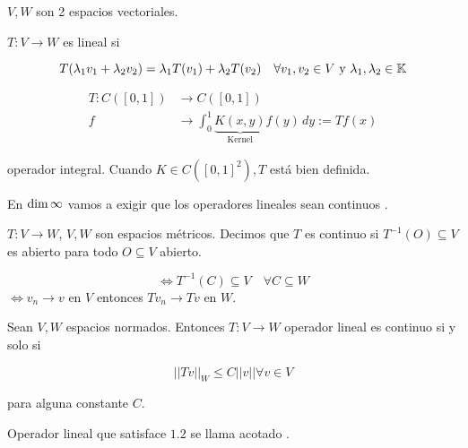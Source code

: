 \documentclass[../Apunte.tex]{subfiles}
\begin{document}
\begin{fdefinition}
    $V,W$ son 2 espacios vectoriales.

    $T:V\to W$ es lineal si 

    \[T(\lambda_1 v_1+\lambda_2 v_2)=\lambda_1 T(v_1)+\lambda_2 T(v_2)\quad \forall v_1,v_2\in V\text{ y } \lambda_1,\lambda_2\in \mathbb{K}\]

\end{fdefinition}

\begin{align*}T:C([0,1])&\to C([0,1])\\
f&\to \int_0^1 \underbrace{K(x,y)}_{\text{Kernel}} f(y)\,dy:=Tf(x)\end{align*}

operador integral. Cuando $K\in C([0,1]^2), T$ está bien definida.

En $\operatorname{dim} \infty$ vamos a exigir que los operadores lineales sean \color{red} continuos \color{black}.

\begin{fdefinition}
    $T:V\to W$, $V,W$ son espacios métricos. Decimos que $T$ es continuo si $T^{-1}(O)\subseteq V$ es abierto para todo $O\subseteq V$ abierto.

    \[\iff T^{-1}(C)\subseteq V\quad \forall C\subseteq W\]
    $\iff v_n\to v$ en $V$ entonces $Tv_n\to Tv$ en $W$.
\end{fdefinition}

\begin{ftheorem}
    Sean $V,W$ espacios normados. Entonces $T:V\to W$ operador lineal es continuo si y solo si

    \begin{equation}||Tv||_W\leq C||v||\forall v\in V\end{equation}

    para alguna constante $C$.
\end{ftheorem}

\begin{fdefinition}
    Operador lineal que satisface $1.2$ se llama \color{red} acotado \color{black}.
\end{fdefinition}
\end{document}
